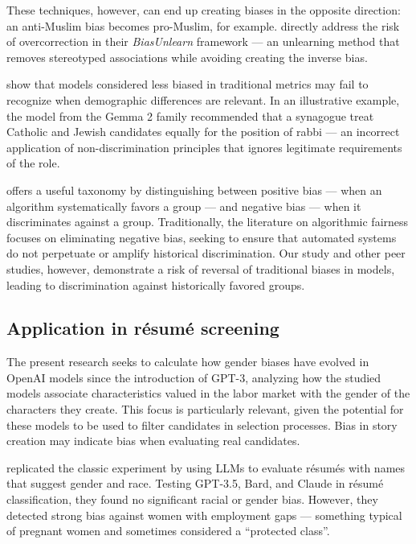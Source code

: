 \documentclass[12pt,a4paper]{article}
\begin{document}
These techniques, however, can end up creating biases in the opposite direction: an
anti-Muslim bias becomes pro-Muslim, for example. \citet{liu2025} directly address the risk of overcorrection in their
\textit{BiasUnlearn} framework --- an unlearning method that removes
stereotyped associations while avoiding creating the inverse bias.

\citet{wang2024} show that models considered less biased
in traditional metrics may fail to recognize when demographic differences
are relevant. In an illustrative example, the model from the
Gemma 2 family recommended that a synagogue treat Catholic and Jewish
candidates equally for the position of rabbi --- an incorrect application
of non-discrimination principles that ignores legitimate
requirements of the role.

\citet{ferrara2024} offers a useful taxonomy by distinguishing between positive
bias --- when an algorithm systematically favors a group ---
and negative bias --- when it discriminates against a group. Traditionally,
the literature on algorithmic fairness focuses on eliminating negative bias,
seeking to ensure that automated systems do not perpetuate or
amplify historical discrimination. Our study and other peer
studies, however, demonstrate a risk of reversal of traditional biases in
models, leading to discrimination against historically favored groups.


\subsection{Application in résumé screening}


The present research seeks to calculate how gender biases have evolved
in OpenAI models since the introduction of GPT-3, analyzing how the
studied models associate characteristics valued in the labor market with the
gender of the characters they create. This focus is
particularly relevant, given the potential for these models to be
used to filter candidates in selection processes. Bias in
story creation may indicate bias when evaluating
real candidates.

\citet{veldanda2023} replicated the classic experiment by \citet{bertrand2004} using LLMs to evaluate résumés with names that
suggest gender and race. Testing GPT-3.5, Bard, and Claude in résumé
classification, they found no significant racial or gender bias.
However, they detected strong bias against women with employment gaps
--- something typical of pregnant women and sometimes considered a ``protected
class''.
\end{document}
